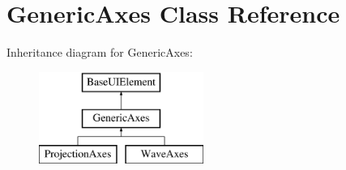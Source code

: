 \hypertarget{classGenericAxes}{\section{Generic\-Axes Class Reference}
\label{classGenericAxes}
}
Inheritance diagram for Generic\-Axes\-:\begin{figure}[H]
\begin{center}
\leavevmode
\includegraphics[height=3.000000cm]{classGenericAxes}
\end{center}
\end{figure}
